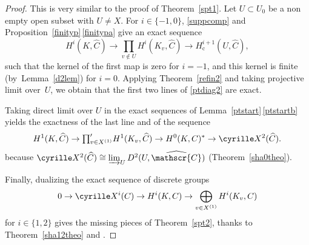\documentclass[JEP,XML,SOM,Unicode, NoEqCountersInSection]{cedram}
\let\mathcal\mathscr
\newcommand{\tprod}{{\textstyle\prod}}
\newcommand{\rc}{\mathrm{c}}
\theoremstyle{plain}
\theoremstyle{definition}
\newcommand \cC {\mathcal{C}}
\newcommand\Sha{\cyrille X}
\begin{document}
\begin{proof} This is very similar to the proof of Theorem~\ref{spt1}.
Let $U \subset U_0$ be a non empty open subset with $U \neq X$.
For $i \in \{-1, 0\}$, \eqref{suppcomp} and Proposition~\ref{finityp}\,\eqref{finitypa}
give an exact sequence\vspace*{-3pt}\enlargethispage{.5\baselineskip}%
\[
H^i(K,\widehat C) \to \tprod_{v \not \in U} H^i(K_v,\widehat C) \to
H^{i+1}_\rc(U,\widehat C),
\]
such that the kernel of the first map is zero for $i=-1$, and this kernel
is finite
(by~Lemma~\ref{d2lem}) for $i=0$. Applying Theorem~\ref{refin2} and
taking projective limit over~$U$, we obtain that the first two lines of
\eqref{ptdiag2} are exact.

Taking direct limit over $U$ in the exact sequences of Lemma~\ref{ptstart}\,\eqref{ptstartb} yields the exactness of the last line and of the sequence\vspace*{-3pt}
\[
H^1(K,\widehat C) \to \tprod^{\prime}_{v \in X^{(1)}} H^1(K_v,\widehat C) \to
H^0(K,C)^* \to \Sha^2(\widehat C).
\]
because $\Sha^2(\widehat C) \cong \varinjlim_U D^2(U,\widehat \cC)$
(\cf Theorem~\ref{sha0theo}).

Finally, dualizing the exact sequence of discrete groups\vspace*{-3pt}
\[
0 \to \Sha^i(C) \to H^i(K,C) \to
\bigoplus_{v \in X^{(1)}} H^i(K_v,C)
\]
for $i \in \{1, 2\}$
gives the missing pieces of Theorem~\ref{spt2}, thanks to
Theorem~\ref{sha12theo} and \cite[Th.\,3.1 \& 3.3]{demphd}.
\end{proof}
\end{document}
